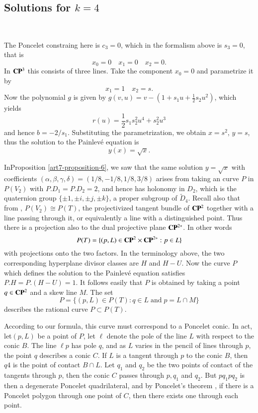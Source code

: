 \subsection{Solutions for \boldmath$k=4$}\label{art7-subsec-6.2}
~

\smallskip
\noindent
The Poncelet constraing here is $c_{3}=0$, which in the formalism above is $s_{3}=0$, that is
$$
x_{0}=0 \quad x_{1}=0 \quad x_{2}=0.
$$
In $\mathbf{C}\mathbf{P}^{3}$ this consists of three lines. Take the component $x_{0}=0$ and parametrize it by
$$
x_{1}=1 \quad x_{2}=s.
$$
Now the polynomial $g$ is given by $g(v,u)=v-(1+s_{1}u+\frac{1}{2}s_{2}u^{2})$, which yields
$$
r(u) = \dfrac{1}{2}s_{1}s_{2}^{2}u^{4} +s_{2}^{2}u^{3}
$$
and hence $b=-2/s_{1}$. Substituting the parametrization, we obtain $x=s^{2}$, $y=s$, thus the solution to the
 Painlev\'e equation is
$$
y(x) = \sqrt{x}.
$$

\begin{remark*}
In\pageoriginale Proposition \ref{art7-proposition-6}, we saw that the same solution $y=\sqrt{x}$ with coefficients $(\alpha, \beta,\gamma, \delta)=(1/8, -1/8, 1/8, 3/8)$ arises from taking an curve $P$ in $P(V_{2})$ with $P.D_{1} =P.D_{2}=2$, and hence has holonomy in $D_{2}$, which is the quaternion group $\{\pm 1, \pm i, \pm j, \pm k\}$, a proper subgroup of $\tilde{D}_{4}$. Recall also that from \cite{art7-key16}, $P(V_{2}) \cong P(T)$, the projectivized tangent bundle of $\mathbf{C}\mathbf{P}^{2}$ together with a line passing through it, or equivalently a line with a distinguished point. Thus there is a projection also to the dual projective plane $\mathbf{C}\mathbf{P}^{2*}$. In other words
$$
P(T)=\{(p, L) \in \mathbf{C}\mathbf{P}^{2} \times \mathbf{C}\mathbf{P}^{2*} : p \in L\}
$$
with projections onto the two factors. In the terminology above, the two corresponding hyperplane divisor classes are $H$ and $H-U$. Now the curve $P$ which defines the solution to the Painlev\'e equation satisfies $P.H =P.(H-U)=1$. It follows easily that $P$ is obtained by taking a point $q\in \mathbf{C}\mathbf{P}^{2}$ and a skew line $M$.  The set
$$
P=\{(p, L) \in P(T) :q \in L \; \text{and} \; p = L\cap M\}
$$
describes the rational curve $P\subset P(T)$.

According to our formula, this curve must correspond to a Poncelet conic. In act, let$(p, L)$ be a point of $P$, let $\ell$ denote the pole of the line $L$ with respect to the conic $B$. The line $\ell p$ has pole $q$, and as $L$ varies in the pencil of lines through $p$, the point $q$ describes a conic $C$. If $L$ is a tangent through $p$ to the conic $B$, then $q4$ is the point of contact $B \cap L$. Let $q_{1}$ and $q_{2}$ be the two points of contact of the tangents through $p$, then the conic $C$ passes through $p, q_{1}$ and $q_{2}$. But $pq_{1}pq_{2}$ is then a degenerate Poncelet quadrilateral, and by Poncelet's theorem \cite{art7-key3}, if there is a Poncelet polygon through one point of $C$, then there exists one through each point.
\end{remark*}

